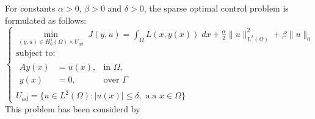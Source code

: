 \documentclass[11pt,a4paper]{amsart}
\newcommand{\om}{\Omega}
\newcommand{\norm}[1]{\lVert #1 \rVert}
\begin{document}
For constants $\alpha>0$, $\beta>0$ and $\delta>0$, the sparse optimal control problem is formulated as follows:
\begin{equation}\label{eq:P}\tag{$P$}
    \begin{cases}
    \displaystyle\min_{(y,u)\in H_0^1(\om)\times U_{ad}}\; J(y,u)=\int_{\om}L(x,y(x))\; dx+\frac{\alpha}{2}\norm{u}^2_{L^2(\om)}+\beta \norm{u}_0\\
    \mbox{subject to:}\\
    \begin{array}{rll}
     Ay(x)&=u(x), &\mbox{in } \om,\\
        y(x)&=0,  &\mbox{over } \Gamma  
     \end{array}\\
     U_{ad}=\{u\in L^2(\om): |u(x)|\le \delta, \text{ a.a }x\in \om\}
    \end{cases}
\end{equation}
This problem has been considerd by \cite{itokun2014}

\end{document}
